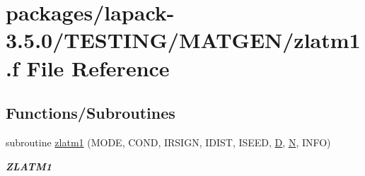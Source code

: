 \hypertarget{zlatm1_8f}{}\section{packages/lapack-\/3.5.0/\+T\+E\+S\+T\+I\+N\+G/\+M\+A\+T\+G\+E\+N/zlatm1.f File Reference}
\label{zlatm1_8f}
\subsection*{Functions/\+Subroutines}
\begin{DoxyCompactItemize}
\item 
subroutine \hyperlink{group__complex16__matgen_ga72abba78ce666b84f3743b5716d0af50}{zlatm1} (M\+O\+D\+E, C\+O\+N\+D, I\+R\+S\+I\+G\+N, I\+D\+I\+S\+T, I\+S\+E\+E\+D, \hyperlink{odrpack_8h_a7dae6ea403d00f3687f24a874e67d139}{D}, \hyperlink{polmisc_8c_a0240ac851181b84ac374872dc5434ee4}{N}, I\+N\+F\+O)
\begin{DoxyCompactList}\small\item\em {\bfseries Z\+L\+A\+T\+M1} \end{DoxyCompactList}\end{DoxyCompactItemize}

